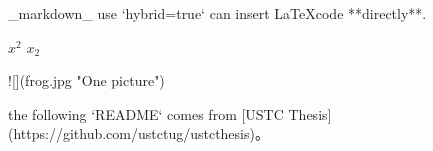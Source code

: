 \documentclass{article}
\begin{document}
\begin{markdown}
_markdown_ use `hybrid=true` can insert \LaTeX code **directly**.

  $x^2$  $x_2$

![](frog.jpg "One picture")

the following `README` comes from [USTC Thesis](https://github.com/ustctug/ustcthesis)。
\end{markdown}

\end{document}
